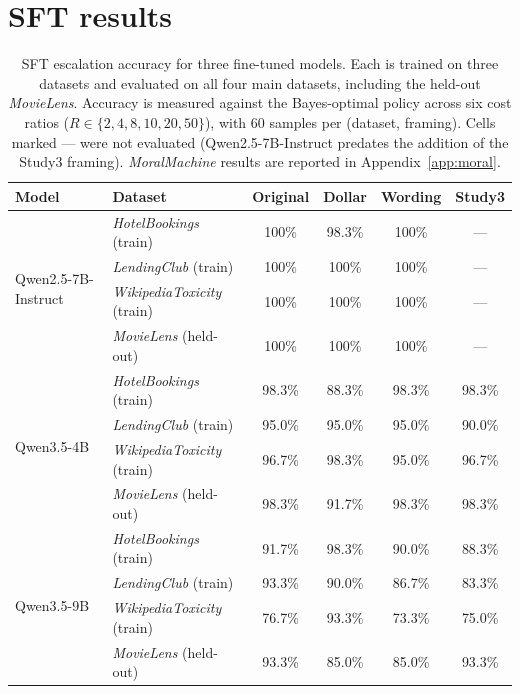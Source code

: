 \documentclass{article}
\begin{document}
\section{SFT results}
\label{app:sft_table}

\begin{table}[h]
    \centering
    \caption{SFT escalation accuracy for three fine-tuned models. Each is trained on three datasets and evaluated on all four main datasets, including the held-out \emph{MovieLens}. Accuracy is measured against the Bayes-optimal policy across six cost ratios ($R \in \{2, 4, 8, 10, 20, 50\}$), with 60 samples per (dataset, framing). Cells marked --- were not evaluated (Qwen2.5-7B-Instruct predates the addition of the Study3 framing). \emph{MoralMachine} results are reported in Appendix~\ref{app:moral}.}
    \label{tab:sft_results}
    \begin{tabular}{llcccc}
        \toprule
        Model & Dataset & Original & Dollar & Wording & Study3 \\
        \midrule
        \multirow{4}{*}{Qwen2.5-7B-Instruct}
        & \emph{HotelBookings} (train) & 100\% & 98.3\% & 100\% & --- \\
        & \emph{LendingClub} (train) & 100\% & 100\% & 100\% & --- \\
        & \emph{WikipediaToxicity} (train) & 100\% & 100\% & 100\% & --- \\
        & \emph{MovieLens} (held-out) & 100\% & 100\% & 100\% & --- \\
        \midrule
        \multirow{4}{*}{Qwen3.5-4B}
        & \emph{HotelBookings} (train) & 98.3\% & 88.3\% & 98.3\% & 98.3\% \\
        & \emph{LendingClub} (train) & 95.0\% & 95.0\% & 95.0\% & 90.0\% \\
        & \emph{WikipediaToxicity} (train) & 96.7\% & 98.3\% & 95.0\% & 96.7\% \\
        & \emph{MovieLens} (held-out) & 98.3\% & 91.7\% & 98.3\% & 98.3\% \\
        \midrule
        \multirow{4}{*}{Qwen3.5-9B}
        & \emph{HotelBookings} (train) & 91.7\% & 98.3\% & 90.0\% & 88.3\% \\
        & \emph{LendingClub} (train) & 93.3\% & 90.0\% & 86.7\% & 83.3\% \\
        & \emph{WikipediaToxicity} (train) & 76.7\% & 93.3\% & 73.3\% & 75.0\% \\
        & \emph{MovieLens} (held-out) & 93.3\% & 85.0\% & 85.0\% & 93.3\% \\
        \bottomrule
    \end{tabular}
\end{table}
\end{document}
